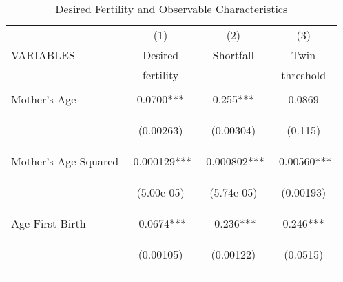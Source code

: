\begin{table}[htpb!]
\caption{Desired Fertility and Observable Characteristics}
\begin{tabular}{lccc} \hline
 & (1) & (2) & (3) \\
VARIABLES & Desired & Shortfall & Twin \\
& fertility & & threshold \\ \hline
\vspace{4pt} & \begin{footnotesize}\end{footnotesize} & \begin{footnotesize}\end{footnotesize} & \begin{footnotesize}\end{footnotesize} \\
Mother's Age & 0.0700*** & 0.255*** & 0.0869  \\
\vspace{4pt} & \begin{footnotesize}(0.00263)\end{footnotesize} & \begin{footnotesize}(0.00304)\end{footnotesize} & \begin{footnotesize}(0.115)\end{footnotesize} \\
Mother's Age Squared & -0.000129*** & -0.000802*** & -0.00560*** \\
\vspace{4pt} & \begin{footnotesize}(5.00e-05)\end{footnotesize} & \begin{footnotesize}(5.74e-05)\end{footnotesize} & \begin{footnotesize}(0.00193)\end{footnotesize} \\
Age First Birth & -0.0674*** & -0.236*** & 0.246*** \\
\vspace{4pt} & \begin{footnotesize}(0.00105)\end{footnotesize} & \begin{footnotesize}(0.00122)\end{footnotesize} & \begin{footnotesize}(0.0515)\end{footnotesize} \\

\end{tabular}
\end{table}
